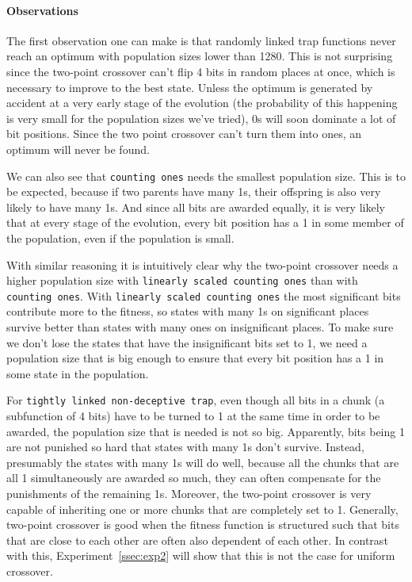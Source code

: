 \documentclass[12pt]{article}
\theoremstyle{definition}
\newcommand{\co}{\texttt{counting ones}}
\newcommand{\lsco}{\texttt{linearly scaled counting ones}}
\newcommand{\tnt}{\texttt{tightly linked non-deceptive trap}}
\begin{document}
\paragraph{Observations}
The first observation one can make is that randomly linked trap functions never reach an optimum with population sizes lower than 1280.
This is not surprising since the two-point crossover can't flip 4 bits in random places at once,
which is necessary to improve to the best state.
Unless the optimum is generated by accident at a very early stage of the evolution
(the probability of this happening is very small for the population sizes we've tried),
0s will soon dominate a lot of bit positions.
Since the two point crossover can't turn them into ones, an optimum will never be found.


We can also see that \co{} needs the smallest population size.
This is to be expected, because if two parents have many 1s,
their offspring is also very likely to have many 1s.
And since all bits are awarded equally, it is very likely that at every stage of the evolution,
every bit position has a 1 in some member of the population, even if the population is small.

With similar reasoning it is intuitively clear why the two-point crossover needs a
higher population size with \lsco{} than with \co{}.
With \lsco{} the most significant bits contribute more to the fitness, so states with many 1s
on significant places survive better than states with many ones on insignificant places.
To make sure we don't lose the states that have the insignificant bits set to 1, we need
a population size that is big enough to ensure that every bit position has a 1
in some state in the population.

For \tnt{}, even though all bits in a chunk (a subfunction of 4 bits) have to be turned to 1
at the same time in order to be awarded, the population size that is needed is not so big.
Apparently, bits being 1 are not punished so hard that states with many 1s don't survive.
Instead, presumably the states with many 1s will do well, because all the chunks that
are all 1 simultaneously are awarded so much, they can often compensate for the punishments of
the remaining 1s.
Moreover, the two-point crossover is very capable of inheriting one or more chunks that are
completely set to 1.
Generally, two-point crossover is good when the fitness function is structured such that
bits that are close to each other are often also dependent of each other.
In contrast with this, Experiment~\ref{ssec:exp2} will show that this is not the case for
uniform crossover.
\end{document}
